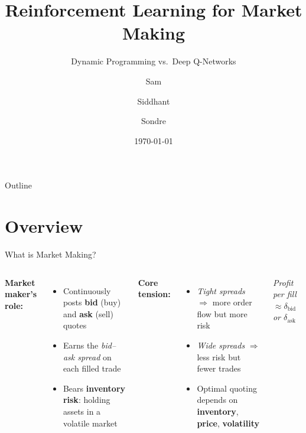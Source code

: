 \documentclass[aspectratio=169]{beamer}
\title[RL for Market Making]{\textbf{Reinforcement Learning for Market Making}}
\subtitle{Dynamic Programming vs.\ Deep Q-Networks}
\author{Sam \and Siddhant \and Sondre}
\date{\today}
\institute{RL Book Course Project}
\newcommand{\1}{\mathbf{1}}
\newcommand{\dB}{\delta_{\mathrm{bid}}}
\newcommand{\dA}{\delta_{\mathrm{ask}}}
\begin{document}
\begin{frame}
  \titlepage
\end{frame}

\begin{frame}{Outline}
  \tableofcontents
\end{frame}

\section{Overview}

\begin{frame}{What is Market Making?}
  \begin{columns}[T]
      \textbf{Market maker's role:}
      \begin{itemize}
        \item Continuously posts \textbf{bid} (buy) and \textbf{ask} (sell) quotes
        \item Earns the \emph{bid--ask spread} on each filled trade
        \item Bears \textbf{inventory risk}: holding assets in a volatile market
      \end{itemize}
      \vspace{1em}
      \textbf{Core tension:}
      \begin{itemize}
        \item \emph{Tight spreads} $\Rightarrow$ more order flow but more risk
        \item \emph{Wide spreads} $\Rightarrow$ less risk but fewer trades
        \item Optimal quoting depends on \textbf{inventory}, \textbf{price}, \textbf{volatility}
      \end{itemize}
      \centering
      \vspace{0.5em}

      \textit{Profit per fill $\approx \delta_{\mathrm{bid}}$ or $\delta_{\mathrm{ask}}$}
  \end{columns}
\end{frame}
\end{document}
